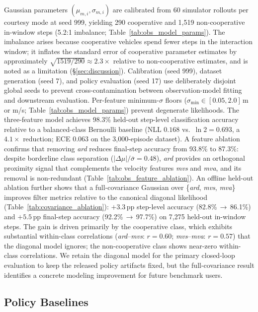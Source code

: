 Gaussian parameters $(\mu_{m,i},\sigma_{m,i})$ are calibrated from 60
simulator rollouts per courtesy mode at seed 999, yielding 290 cooperative
and 1{,}519 non-cooperative in-window steps (5.2:1 imbalance;
Table~\ref{tab:obs_model_params}).
The imbalance arises because cooperative vehicles spend fewer steps in the
interaction window; it inflates the standard error of cooperative parameter
estimates by approximately $\sqrt{1519/290}{\approx}2.3{\times}$ relative to
non-cooperative estimates, and is noted as a limitation (\S\ref{sec:discussion}).
Calibration (seed 999), dataset generation (seed 7), and policy evaluation
(seed 17) use deliberately disjoint global seeds to prevent cross-contamination
between observation-model fitting and downstream evaluation.
Per-feature minimum-$\sigma$ floors ($\sigma_\text{min}\in[0.05,2.0]$\,m
or m/s; Table~\ref{tab:obs_model_params}) prevent degenerate likelihoods.
The three-feature model achieves 98.3\% held-out step-level classification
accuracy relative to a balanced-class Bernoulli baseline
(NLL $0.168$ vs.\ $\ln 2{=}0.693$, a $4.1{\times}$ reduction;
ECE $0.063$ on the 3{,}000-episode dataset).
A feature ablation confirms that removing \emph{ard} reduces final-step
accuracy from 93.8\% to 87.3\%: despite borderline class separation
($|\Delta\mu|/\bar\sigma{=}0.48$), \emph{ard} provides an orthogonal
proximity signal that complements the velocity features \emph{mvs} and
\emph{mva}, and its removal is non-redundant
(Table~\ref{tab:obs_feature_ablation}).
An offline held-out ablation further shows that a full-covariance Gaussian
over \{\emph{ard}, \emph{mvs}, \emph{mva}\} improves filter metrics relative
to the canonical diagonal likelihood (Table~\ref{tab:covariance_ablation}):
$+3.3$\,pp step-level accuracy (82.8\%\,$\to$\,86.1\%) and $+5.5$\,pp
final-step accuracy (92.2\%\,$\to$\,97.7\%) on 7{,}275 held-out in-window steps.
The gain is driven primarily by the cooperative class, which exhibits substantial
within-class correlations (\emph{ard}--\emph{mvs}: $r{=}0.60$;
\emph{mvs}--\emph{mva}: $r{=}0.57$) that the diagonal model ignores;
the non-cooperative class shows near-zero within-class correlations.
We retain the diagonal model for the primary closed-loop evaluation to keep
the released policy artifacts fixed, but the full-covariance result identifies
a concrete modeling improvement for future benchmark users.

\subsection{Policy Baselines}
\label{sec:baselines}
